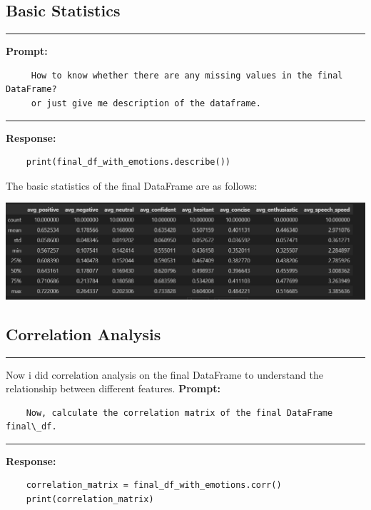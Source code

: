 \documentclass[11pt,a4paper]{article}
\begin{document}
\subsection{Basic Statistics}
\begin{center}
    \color{red}\rule{1\linewidth}{1mm}
\end{center}
\textbf{Prompt:}
\begin{tcolorbox}
    \begin{lstlisting}
     How to know whether there are any missing values in the final DataFrame?
     or just give me description of the dataframe.
    \end{lstlisting}
\end{tcolorbox}
\begin{center}
    \color{red}\rule{1\linewidth}{0.5mm}
\end{center}
\textbf{Response:}
\begin{tcolorbox}
    \begin{lstlisting}
    print(final_df_with_emotions.describe())
    \end{lstlisting}
\end{tcolorbox}

\large{The basic statistics of the final DataFrame are as follows:}
\begin{center}
    \includegraphics[width=1\columnwidth]{images_prompts/basic-stats.png}
\end{center}


\subsection{Correlation Analysis}
\begin{center}
    \color{red}\rule{1\linewidth}{1mm}
\end{center}
    Now i did correlation analysis on the final DataFrame to understand the relationship between different features.
\textbf{Prompt:}
\begin{tcolorbox}
    \begin{lstlisting}
    Now, calculate the correlation matrix of the final DataFrame final\_df.
\end{lstlisting}
\end{tcolorbox}
\begin{center}
    \color{red}\rule{1\linewidth}{0.5mm}
\end{center}
\textbf{Response:}
\begin{tcolorbox}
    \begin{lstlisting}
    correlation_matrix = final_df_with_emotions.corr()
    print(correlation_matrix)
    \end{lstlisting}
\end{tcolorbox}
\end{document}
